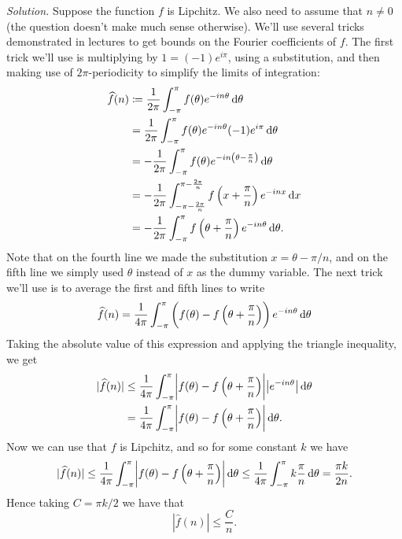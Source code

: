 \documentclass{article}
\begin{document}
\textit{Solution.}
Suppose the function $f$ is Lipchitz. We also need to assume that $n
\neq 0$ (the question doesn't make much sense otherwise). We'll use
several tricks demonstrated in lectures to get bounds on the Fourier
coefficients of $f$. The first trick we'll use is multiplying by $1 =
(-1) e^{i \pi}$, using a substitution, and then making use of
$2\pi$-periodicity to simplify the limits of integration:
%
\begin{align*}
    \widehat{f}(n)
        &\coloneqq \frac{1}{2 \pi} \int_{-\pi}^\pi f(\theta) e^{-i n \theta} \dif \theta \\
        &= \frac{1}{2 \pi} \int_{-\pi}^\pi f(\theta) e^{-i n \theta} (-1) e^{i \pi} \dif \theta \\
        &= - \frac{1}{2 \pi} \int_{-\pi}^\pi f(\theta) e^{-i n \del{\theta - \frac{\pi}{n}}} \dif \theta \\
        &= - \frac{1}{2 \pi} \int_{-\pi - \frac{2 \pi}{n}}^{\pi - \frac{2 \pi}{n}} f\del[2]{x + \frac{\pi}{n}} e^{-i n x} \dif x \\
        &= - \frac{1}{2 \pi} \int_{-\pi}^{\pi} f\del[2]{\theta + \frac{\pi}{n}} e^{-i n \theta} \dif \theta
        .
\end{align*}
%
Note that on the fourth line we made the substitution
$x = \theta - \pi / n$, and on the fifth line we simply used $\theta$
instead of $x$ as the dummy variable. The next trick we'll use is to
average the first and fifth lines to write
%
\begin{equation*}
    \widehat{f}(n) = \frac{1}{4 \pi} \int_{-\pi}^{\pi}
        \del{f(\theta) - f\del[2]{\theta + \frac{\pi}{n}}}
        e^{-i n \theta}
        \dif \theta
\end{equation*}
%
Taking the absolute value of this expression and applying the triangle
inequality, we get
%
\begin{align*}
    |\widehat{f}(n)|
        &\leq \frac{1}{4 \pi} \int_{-\pi}^{\pi}
        \envert[3]{f(\theta) - f\del[2]{\theta + \frac{\pi}{n}}}
        \envert[1]{e^{-i n \theta}}
        \dif \theta
        \\
        &= \frac{1}{4 \pi} \int_{-\pi}^{\pi}
        \envert[3]{f(\theta) - f\del[2]{\theta + \frac{\pi}{n}}}
        \dif \theta
    .
\end{align*}
%
Now we can use that $f$ is Lipchitz, and so for some constant $k$ we have
%
\begin{equation*}
    |\widehat{f}(n)|
        \leq \frac{1}{4 \pi} \int_{-\pi}^{\pi}
        \envert[3]{f(\theta) - f\del[2]{\theta + \frac{\pi}{n}}}
        \dif \theta
        \leq \frac{1}{4 \pi} \int_{-\pi}^{\pi}
        k \frac{\pi}{n}
        \dif \theta
        = \frac{\pi k}{2 n}
    .
\end{equation*}
%
Hence taking $C = \pi k / 2$ we have that
%
\begin{equation*}
    |\widehat{f}(n)| \leq \frac{C}{n}
    .
\end{equation*}
\end{document}
